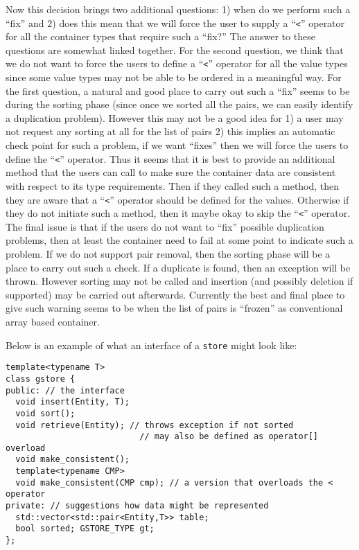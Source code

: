 \documentclass{article}
\begin{document}
Now this decision brings two additional questions: 1) when do we perform
such a ``fix'' and 2) does this mean that we will force the user to
supply a ``\texttt{<}'' operator for all the container types that
require such a ``fix?''  The answer to these questions are somewhat
linked together.  For the second question, we think that we do not want
to force the users to define a ``\texttt{<}'' operator for all the value
types since some value types may not be able to be ordered in a
meaningful way.  For the first question, a natural and good place to
carry out such a ``fix'' seems to be during the sorting phase (since
once we sorted all the pairs, we can easily identify a duplication
problem).  However this may not be a good idea for 1) a user may not
request any sorting at all for the list of pairs 2) this implies an
automatic check point for such a problem, if we want ``fixes'' then we
will force the users to define the ``\texttt{<}'' operator.  Thus it
seems that it is best to provide an additional method that the users can
call to make sure the container data are consistent with respect to its
type requirements.  Then if they called such a method, then they are
aware that a ``\texttt{<}'' operator should be defined for the values.
Otherwise if they do not initiate such a method, then it maybe okay to
skip the ``\texttt{<}'' operator.  The final issue is that if the users
do not want to ``fix'' possible duplication problems, then at least the
container need to fail at some point to indicate such a problem.  If we
do not support pair removal, then the sorting phase will be a place to
carry out such a check.  If a duplicate is found, then an exception will
be thrown.  However sorting may not be called and insertion (and
possibly deletion if supported) may be carried out afterwards.
Currently the best and final place to give such warning seems to be when
the list of pairs is ``frozen'' as conventional array based container.

Below is an example of what an interface of a \texttt{store} might look
like:
\begin{lstlisting}
template<typename T>
class gstore {
public: // the interface
  void insert(Entity, T);
  void sort();
  void retrieve(Entity); // throws exception if not sorted
                           // may also be defined as operator[] overload
  void make_consistent();
  template<typename CMP>
  void make_consistent(CMP cmp); // a version that overloads the < operator
private: // suggestions how data might be represented
  std::vector<std::pair<Entity,T>> table;
  bool sorted; GSTORE_TYPE gt;
};
\end{lstlisting}
\end{document}
